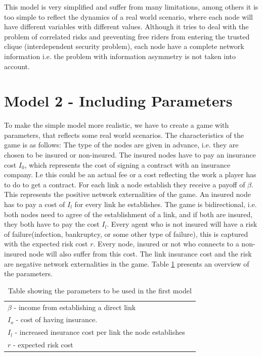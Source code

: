This model is very simplified and suffer from many limitations, among others it is too simple to reflect the dynamics of a real world scenario, where each node will have different variables with different values. Although it tries to deal with the problem of correlated risks and preventing free riders from entering the trusted clique (interdependent security problem), each node have a complete network information i.e. the problem with information asymmetry is not taken into account. 

\section{Model 2 - Including Parameters}
To make the simple model more realistic, we have to create a game with parameters, that reflects some real world scenarios. The characteristics of the game is as follows: The type of the nodes are given in advance, i.e. they are chosen to be insured or non-insured. The insured nodes have to pay an insurance cost $I_{0}$, which represents the cost of signing a contract with an insurance company. I.e this could be an actual fee or a cost reflecting the work a player has to do to get a contract. For each link a node establish they receive a payoff of $\beta$. This represents the positive network externalities of the game. An insured node has to pay a cost of $I_{l}$ for every link he establishes. The game is bidirectional, i.e. both nodes need to agree of the establishment of a link, and if both are insured, they both have to pay the cost $I_{l}$. 
Every agent who is not insured will have a risk of failure(infection, bankruptcy, or some other type of failure), this is captured with the expected risk cost $r$. Every node, insured or not who connects to a non-insured node will also suffer from this cost. The link insurance cost and the risk are negative network externalities in the game. Table \ref{tbl:simplegamepara} presents an overview of the parameters. 
\begin{table}[h]
\centering
\begin{tabular}{lc}
 \hline
  $\beta$ - income from establishing a direct link \\
  $I_{o}$ - cost of having insurance. \\
  $I_{l}$ - increased insurance cost per link the node establishes\\
  $r$ - expected risk cost\\
  \hline
\end{tabular}
\caption{Table showing the parameters to be used in the first model \label{tbl:simplegamepara}}
\end{table}
